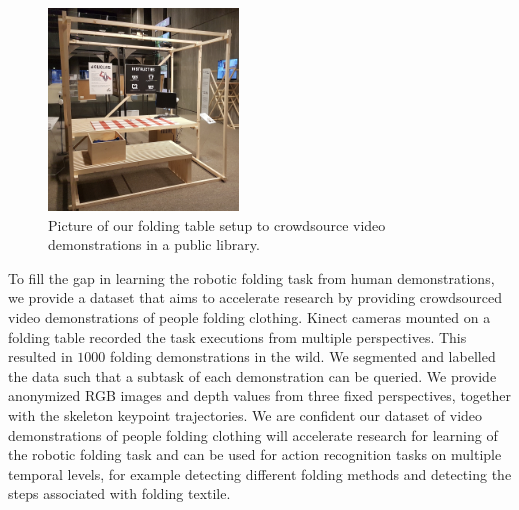 \documentclass[\home/main.tex]{subfiles}
\begin{document}
\begin{figure}[htpb]
    \centering
    \includegraphics[width=0.45\textwidth,keepaspectratio]{figures/douglas_empty} 
    \caption{Picture of our folding table setup to crowdsource video demonstrations in a public library. } %
    \label{fig:douglas}
  \end{figure}
  
  To fill the gap in learning the robotic folding task from human demonstrations, we provide a dataset that aims to accelerate research by providing crowdsourced video demonstrations of people folding clothing. Kinect cameras mounted on a folding table recorded the task executions from multiple perspectives. This resulted in $1000$ folding demonstrations in the wild. We segmented and labelled the data such that a subtask of each demonstration can be queried. We provide anonymized RGB images and depth values from three fixed perspectives, together with the skeleton keypoint trajectories. We are confident our dataset of video demonstrations of people folding clothing will accelerate research for learning of the robotic folding task and can be used for action recognition tasks on multiple temporal levels, for example detecting different folding methods and detecting the steps associated with folding textile.
  
\end{document}
